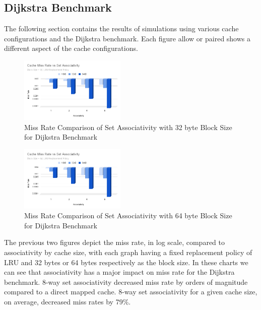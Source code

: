 \documentclass[conference]{IEEEtran}
\begin{document}
\subsection{Dijkstra Benchmark}

The following section contains the results of simulations using various cache configurations and the Dijkstra benchmark. Each figure allow or paired shows a different aspect of the cache configurations.

\begin{figure}[H]
  \centering
  \includegraphics[width=0.45\textwidth]{dijkstraFigures/CacheMissRateVsSetAssociativity32.png}
  \caption{Miss Rate Comparison of Set Associativity with 32 byte Block Size for Dijkstra Benchmark}
  \label{fig:MissRateVsSetAssoc32}
\end{figure}

\begin{figure}[H]
    \centering
    \includegraphics[width=0.45\textwidth]{dijkstraFigures/CacheMissRatevsSetAssociativity64.png}
    \caption{Miss Rate Comparison of Set Associativity with 64 byte Block Size for Dijkstra Benchmark}
    \label{fig:MissRateVsSetAssoc64}
  \end{figure}
    
The previous two figures depict the miss rate, in log scale, compared to associativity by cache size, with each graph having a fixed replacement policy of LRU and 32 bytes or 64 bytes respectively as the block size. In these charts we can see that associativity has a major impact on miss rate for the Dijkstra benchmark. 8-way set associativity decreased miss rate by orders of magnitude compared to a direct mapped cache. 8-way set associativity for a given cache size, on average, decreased miss rates by 79\%.
\end{document}
